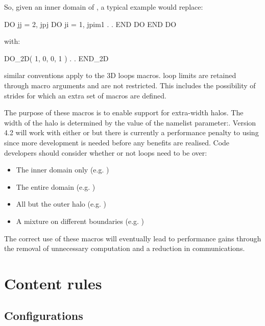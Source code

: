 So, given an inner domain of , a typical example would replace:
\begin{forlines}
   DO jj = 2, jpj
      DO ji = 1, jpim1
         .
         .
      END DO
   END DO
\end{forlines}

with:

\begin{forlines}
   DO_2D( 1, 0, 0, 1 )
      .
      .
   END_2D
\end{forlines}

similar conventions apply to the 3D loops macros.  loop limits are retained through macro arguments
and are not restricted. This includes the possibility of strides for which an extra set of 
macros are defined.

The purpose of these macros is to enable support for extra-width halos. The width of the halo is determined by 
the value of the namelist parameter:. Version 4.2 will work with either  or
 but there is currently a performance penalty to using  since more development
is needed before any benefits are realised. Code developers should consider whether or not loops need to be over:

\begin{itemize}
\item The inner domain only (e.g. ) 
\item The entire domain (e.g. ) 
\item All but the outer halo (e.g. )
\item A mixture on different boundaries (e.g. )
\end{itemize}

The correct use of these macros will eventually lead to performance gains through the removal of 
unnecessary computation and a reduction in communications.

\section{Content rules}

\subsection{Configurations}

